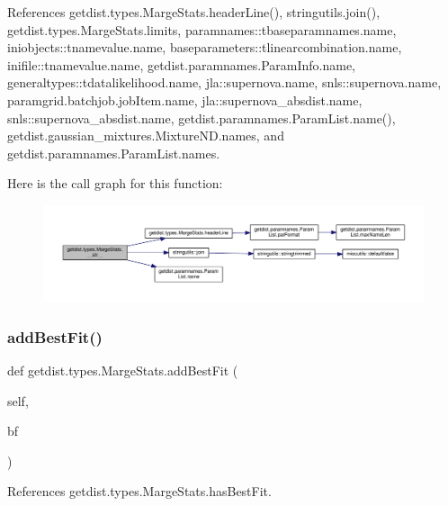 References getdist.\+types.\+Marge\+Stats.\+header\+Line(), stringutils.\+join(), getdist.\+types.\+Marge\+Stats.\+limits, paramnames\+::tbaseparamnames.\+name, iniobjects\+::tnamevalue.\+name, baseparameters\+::tlinearcombination.\+name, inifile\+::tnamevalue.\+name, getdist.\+paramnames.\+Param\+Info.\+name, generaltypes\+::tdatalikelihood.\+name, jla\+::supernova.\+name, snls\+::supernova.\+name, paramgrid.\+batchjob.\+job\+Item.\+name, jla\+::supernova\+\_\+absdist.\+name, snls\+::supernova\+\_\+absdist.\+name, getdist.\+paramnames.\+Param\+List.\+name(), getdist.\+gaussian\+\_\+mixtures.\+Mixture\+N\+D.\+names, and getdist.\+paramnames.\+Param\+List.\+names.

Here is the call graph for this function\+:
\nopagebreak
\begin{figure}[H]
\begin{center}
\leavevmode
\includegraphics[width=350pt]{classgetdist_1_1types_1_1MargeStats_ae9efeba91d3389c8a961b100fda0ec1c_cgraph}
\end{center}
\end{figure}
\mbox{\label{classgetdist_1_1types_1_1MargeStats_aaab0b35dae558f300d311c2baaf1237c}} 
\subsubsection{\texorpdfstring{add\+Best\+Fit()}{addBestFit()}}
{\footnotesize\ttfamily def getdist.\+types.\+Marge\+Stats.\+add\+Best\+Fit (\begin{DoxyParamCaption}\item[{}]{self,  }\item[{}]{bf }\end{DoxyParamCaption})}



References getdist.\+types.\+Marge\+Stats.\+has\+Best\+Fit.

\mbox{\label{classgetdist_1_1types_1_1MargeStats_a739268ba287cfaad79b4ba5039e832e8}} 
